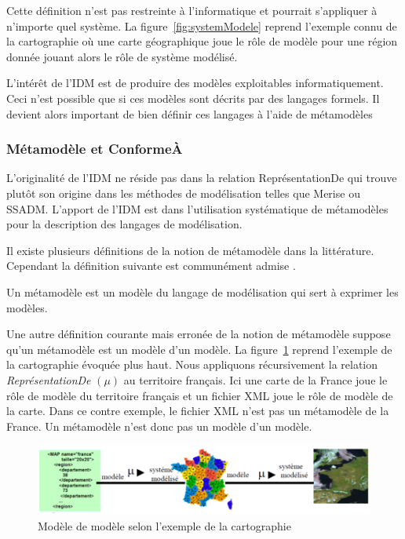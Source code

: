 Cette définition n'est pas restreinte à l'informatique et pourrait s'appliquer à 
n'importe quel système. 
La figure~\ref{fig:systemModele} reprend l'exemple connu de la cartographie où 
une carte géographique joue le rôle de modèle pour une région donnée jouant 
alors le rôle de système modélisé. 

L'intérêt de l'IDM est de produire des modèles exploitables informatiquement. 
Ceci n'est possible que si ces modèles sont décrits par des langages formels. Il 
devient alors important de bien définir ces langages à l'aide de métamodèles

\subsubsection{Métamodèle et ConformeÀ}
L'originalité de l'IDM ne réside pas dans la relation ReprésentationDe qui 
trouve plutôt son origine dans les méthodes de modélisation telles que Merise ou 
SSADM. L'apport de l'IDM est dans l'utilisation systématique de métamodèles pour 
la description des langages de modélisation. 

Il existe plusieurs définitions de la notion de métamodèle dans la littérature. 
Cependant la définition suivante est communément admise 
\cite{bezivin2004rapport}.

\begin{definition}
Un métamodèle est un modèle du langage de modélisation qui sert à exprimer les 
modèles.
\end{definition}
Une autre définition courante mais erronée de la notion de métamodèle suppose 
qu'un métamodèle est un modèle d'un modèle. La figure~\ref{fig:modelofmodel} 
reprend l'exemple de la cartographie évoquée plus haut. Nous appliquons 
récursivement la relation \textit{ReprésentationDe} $(\mu)$ au territoire 
français. Ici une carte de la France joue le rôle de modèle du territoire 
français et un fichier XML joue le rôle de modèle de la carte. Dans ce contre 
exemple, le fichier XML n'est pas un métamodèle de la France. Un métamodèle 
n'est donc pas un modèle d'un modèle.

\begin{figure}[!htbp]
 \begin{center}
  \includegraphics[width=1\textwidth]{images/Chapitre1/modelofmodel.png}
 \end{center}
 \caption{Modèle de modèle selon l'exemple de la cartographie 
\protect\cite{favre2006ingenierie}}
 \label{fig:modelofmodel}
\end{figure}

